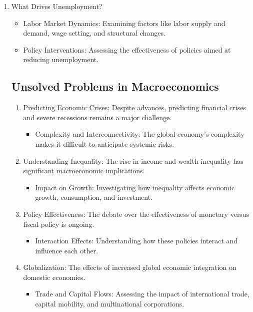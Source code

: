\documentclass[10pt]{article}
\begin{document}
\begin{enumerate}
  \item What Drives Unemployment?

    \begin{itemize}
      \item Labor Market Dynamics: Examining factors like labor supply and demand, wage setting, and structural changes.
      \item Policy Interventions: Assessing the effectiveness of policies aimed at reducing unemployment.
    \end{itemize}

\subsection*{Unsolved Problems in Macroeconomics}
\begin{enumerate}
  \item Predicting Economic Crises: Despite advances, predicting financial crises and severe recessions remains a major challenge.

    \begin{itemize}
      \item Complexity and Interconnectivity: The global economy's complexity makes it difficult to anticipate systemic risks.
    \end{itemize}

  \item Understanding Inequality: The rise in income and wealth inequality has significant macroeconomic implications.

    \begin{itemize}
      \item Impact on Growth: Investigating how inequality affects economic growth, consumption, and investment.
    \end{itemize}

  \item Policy Effectiveness: The debate over the effectiveness of monetary versus fiscal policy is ongoing.

    \begin{itemize}
      \item Interaction Effects: Understanding how these policies interact and influence each other.
    \end{itemize}

  \item Globalization: The effects of increased global economic integration on domestic economies.

    \begin{itemize}
      \item Trade and Capital Flows: Assessing the impact of international trade, capital mobility, and multinational corporations.
    \end{itemize}


\end{enumerate}
\end{enumerate}
\end{document}
